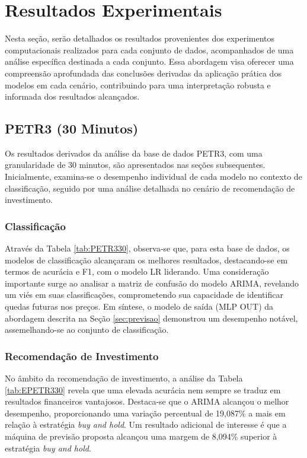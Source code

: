 \section{Resultados Experimentais}
\label{sec:resultados_experimentais}
Nesta seção, serão detalhados os resultados provenientes dos experimentos computacionais realizados para cada conjunto de dados, acompanhados de uma análise específica destinada a cada conjunto. Essa abordagem visa oferecer uma compreensão aprofundada das conclusões derivadas da aplicação prática dos modelos em cada cenário, contribuindo para uma interpretação robusta e informada dos resultados alcançados.

\subsection{PETR3 (30 Minutos)}
Os resultados derivados da análise da base de dados PETR3, com uma granularidade de 30 minutos, são apresentados nas seções subsequentes. Inicialmente, examina-se o desempenho individual de cada modelo no contexto de classificação, seguido por uma análise detalhada no cenário de recomendação de investimento.
\subsubsection{Classificação}
Através da Tabela \ref{tab:PETR330}, observa-se que, para esta base de dados, os modelos de classificação alcançaram os melhores resultados, destacando-se em termos de acurácia e \ac{F1}, com o modelo \ac{LR} liderando. Uma consideração importante surge ao analisar a matriz de confusão do modelo \ac{ARIMA}, revelando um viés em suas classificações, comprometendo sua capacidade de identificar quedas futuras nos preços. Em síntese, o modelo de saída (\ac{MLP} OUT) da abordagem descrita na Seção \ref{sec:previsao} demonstrou um desempenho notável, assemelhando-se ao conjunto de classificação.
\subsubsection{Recomendação de Investimento}
No âmbito da recomendação de investimento, a análise da Tabela \ref{tab:EPETR330} revela que uma elevada acurácia nem sempre se traduz em resultados financeiros vantajosos. Destaca-se que o \ac{ARIMA} alcançou o melhor desempenho, proporcionando uma variação percentual de 19,087\% a mais em relação à estratégia \textit{buy and hold}. Um resultado adicional de interesse é que a máquina de previsão proposta alcançou uma margem de 8,094\% superior à estratégia \textit{buy and hold}.

